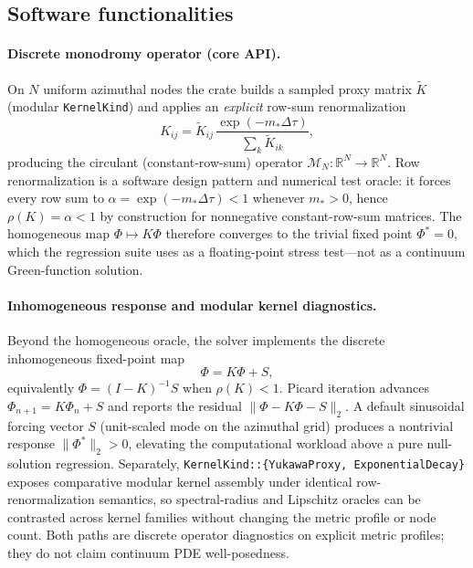 \documentclass[preprint,12pt,a4paper]{elsarticle}
\newcommand{\MN}{\mathcal{M}_{N}}
\begin{document}
\subsection{Software functionalities}
\label{sec:functionalities}

\paragraph{Discrete monodromy operator (core API).}
On $N$ uniform azimuthal nodes the crate builds a sampled proxy matrix $\widetilde{K}$ (modular \texttt{KernelKind}) and applies an \emph{explicit} row-sum renormalization
\begin{equation}
\label{eq:K-renorm}
K_{ij}
=
\widetilde{K}_{ij}\,
\frac{\exp(-m_{\ast}\Delta\tau)}{\sum_{k}\widetilde{K}_{ik}},
\end{equation}
producing the circulant (constant-row-sum) operator $\MN:\mathbb{R}^{N}\to\mathbb{R}^{N}$.
Row renormalization is a software design pattern and numerical test oracle: it forces every row sum to $\alpha=\exp(-m_{\ast}\Delta\tau)<1$ whenever $m_{\ast}>0$, hence $\rho(K)=\alpha<1$ by construction for nonnegative constant-row-sum matrices.
The homogeneous map $\Phi\mapsto K\Phi$ therefore converges to the trivial fixed point $\Phi^{*}=0$, which the regression suite uses as a floating-point stress test---not as a continuum Green-function solution.

\paragraph{Inhomogeneous response and modular kernel diagnostics.}
\label{sec:inhomogeneous}
Beyond the homogeneous oracle, the solver implements the discrete inhomogeneous fixed-point map
\begin{equation}
\label{eq:inhomo}
\Phi = K\Phi + S,
\end{equation}
equivalently $\Phi=(I-K)^{-1}S$ when $\rho(K)<1$.
Picard iteration advances $\Phi_{n+1}=K\Phi_n+S$ and reports the residual $\|\Phi-K\Phi-S\|_{2}$.
A default sinusoidal forcing vector $S$ (unit-scaled mode on the azimuthal grid) produces a nontrivial response $\|\Phi^{*}\|_{2}>0$, elevating the computational workload above a pure null-solution regression.
Separately, \texttt{KernelKind::\{YukawaProxy, ExponentialDecay\}} exposes comparative modular kernel assembly under identical row-renormalization semantics, so spectral-radius and Lipschitz oracles can be contrasted across kernel families without changing the metric profile or node count.
Both paths are discrete operator diagnostics on explicit metric profiles; they do not claim continuum PDE well-posedness.
\end{document}
